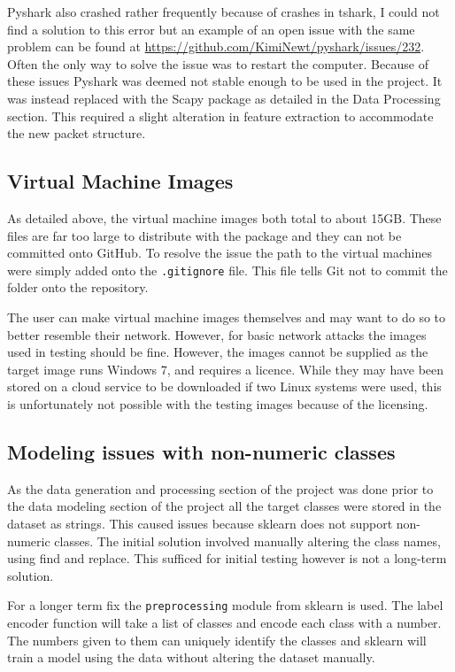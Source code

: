 Pyshark also crashed rather frequently because of crashes in tshark, I could not find a solution to this error but an example of an open issue with the same problem can be found at \url{https://github.com/KimiNewt/pyshark/issues/232}. Often the only way to solve the issue was to restart the computer. Because of these issues Pyshark was deemed not stable enough to be used in the project. It was instead replaced with the Scapy package as detailed in the Data Processing section. This required a slight alteration in feature extraction to accommodate the new packet structure.
\subsection{Virtual Machine Images}
As detailed above, the virtual machine images both total to about 15GB. These files are far too large to distribute with the package and they can not be committed onto GitHub. To resolve the issue the path to the virtual machines were simply added onto the \texttt{.gitignore} file. This file tells Git not to commit the folder onto the repository. 

The user can make virtual machine images themselves and may want to do so to better resemble their network. However, for basic network attacks the images used in testing should be fine. However, the images cannot be supplied as the target image runs Windows 7, and requires a licence. While they may have been stored on a cloud service to be downloaded if two Linux systems were used, this is unfortunately not possible with the testing images because of the licensing.

\subsection{Modeling issues with non-numeric classes}
As the data generation and processing section of the project was done prior to the data modeling section of the project all the target classes were stored in the dataset as strings. This caused issues because sklearn does not support non-numeric classes. The initial solution involved manually altering the class names, using find and replace. This sufficed for initial testing however is not a long-term solution. 

For a longer term fix the \texttt{preprocessing} module from sklearn is used. The label encoder function will take a list of classes and encode each class with a number. The numbers given to them can uniquely identify the classes and sklearn will train a model using the data without altering the dataset manually. 

